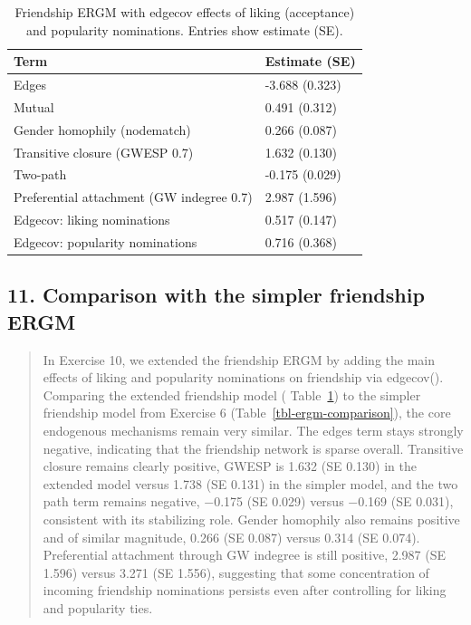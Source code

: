 \documentclass[
  letterpaper,
  DIV=11,
  numbers=noendperiod]{scrartcl}
\begin{document}
\begin{longtable}[]{@{}ll@{}}

\caption{\label{tbl-q10-friendship-edgecov}Friendship ERGM with edgecov
effects of liking (acceptance) and popularity nominations. Entries show
estimate (SE).}

\tabularnewline

\toprule\noalign{}
Term & Estimate (SE) \\
\midrule\noalign{}
\endhead
\bottomrule\noalign{}
\endlastfoot
Edges & -3.688 (0.323) \\
Mutual & 0.491 (0.312) \\
Gender homophily (nodematch) & 0.266 (0.087) \\
Transitive closure (GWESP 0.7) & 1.632 (0.130) \\
Two-path & -0.175 (0.029) \\
Preferential attachment (GW indegree 0.7) & 2.987 (1.596) \\
Edgecov: liking nominations & 0.517 (0.147) \\
Edgecov: popularity nominations & 0.716 (0.368) \\

\end{longtable}

\subsection{11. Comparison with the simpler friendship
ERGM}\label{comparison-with-the-simpler-friendship-ergm}

\begin{quote}
In Exercise 10, we extended the friendship ERGM by adding the main
effects of liking and popularity nominations on friendship via
edgecov(). Comparing the extended friendship model (
Table~\ref{tbl-q10-friendship-edgecov}) to the simpler friendship model
from Exercise 6 (Table~\ref{tbl-ergm-comparison}), the core endogenous
mechanisms remain very similar. The edges term stays strongly negative,
indicating that the friendship network is sparse overall. Transitive
closure remains clearly positive, GWESP is 1.632 (SE 0.130) in the
extended model versus 1.738 (SE 0.131) in the simpler model, and the two
path term remains negative, −0.175 (SE 0.029) versus −0.169 (SE 0.031),
consistent with its stabilizing role. Gender homophily also remains
positive and of similar magnitude, 0.266 (SE 0.087) versus 0.314 (SE
0.074). Preferential attachment through GW indegree is still positive,
2.987 (SE 1.596) versus 3.271 (SE 1.556), suggesting that some
concentration of incoming friendship nominations persists even after
controlling for liking and popularity ties.
\end{quote}
\end{document}
